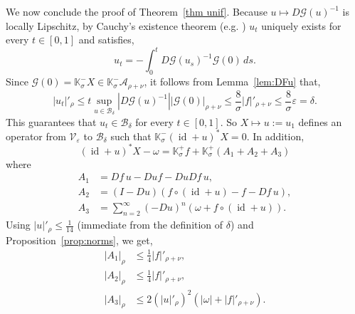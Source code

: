 \documentclass[12pt,reqno,a4paper]{amsart}%
\numberwithin{equation}{section}
\newcommand{\Vs}{{\mathscr{V}}}
\newcommand{\Bs}{{\mathscr{B}}}
\newcommand{\A}{{\mathcal A}}
\newcommand{\GG}{{\mathcal G}}
\newcommand{\Kk}{{\mathbb{K}}}
\newcommand{\id}  {\operatorname{id}}
\begin{document}


We now conclude the proof of Theorem~\ref{thm unif}.  Because $u\mapsto D\GG(u)^{-1}$ is locally Lipschitz,  by Cauchy's existence theorem (e.g. \cite[Theorem 10.4.5 and Remark 10.4.6]{Dieudonne1960}) $u_t$ uniquely exists for every $t\in[0,1]$ and satisfies,
$$
u_t=-\int_0^tD\GG(u_s)^{-1}\GG(0)\,ds.
$$
Since $\GG(0)=\Kk_\sigma^- X\in\Kk_\sigma^-\A_{\rho+\nu}$, it follows from Lemma~\ref{lem:DFu} that, 
\begin{equation}\label{norm of u}
|u_t|'_{\rho}\leq t \sup_{u\in\Bs_\delta}|D\GG(u)^{-1}||\GG(0)|_{\rho+\nu}\leq\frac{8}{\sigma}|f|'_{\rho+\nu}\leq \frac{8}{\sigma}\varepsilon=\delta.
\end{equation}
This guarantees that $u_t\in\Bs_\delta$ for every $t\in[0,1]$. So $X\mapsto u:=u_1$ defines an operator from $\Vs_\varepsilon$ to $\Bs_\delta$ such that $\Kk^-_\sigma(\id+u)^*X = 0$.
In addition, 
$$
(\id+u)^*X-\omega=\Kk^+_\sigma f+\Kk^+_\sigma(A_1 +A_2+A_3)
$$
where 
\begin{align*}
A_1&=Df\,u-Duf-DuDf\,u,\\
A_2&=\left(I-Du\right)\left(f\circ(\id+u)-f-Df\,u\right),\\
A_3&=\sum_{n=2}^\infty(-Du)^n\left(\omega+f\circ(\id+u)\right).
\end{align*}
Using $|u|'_\rho \leq \frac{1}{14}$ (immediate from the definition of $\delta$) and Proposition~\ref{prop:norms},  we get,
\begin{align*}
|A_1|_{\rho}&\leq \frac14|f|'_{\rho+\nu},\\
|A_2|_{\rho}&\leq\frac14|f|'_{\rho+\nu},\\
|A_3|_{\rho}&\leq 2(|u|'_\rho)^2(|\omega|+|f|'_{\rho+\nu}).
\end{align*}
\end{document}
